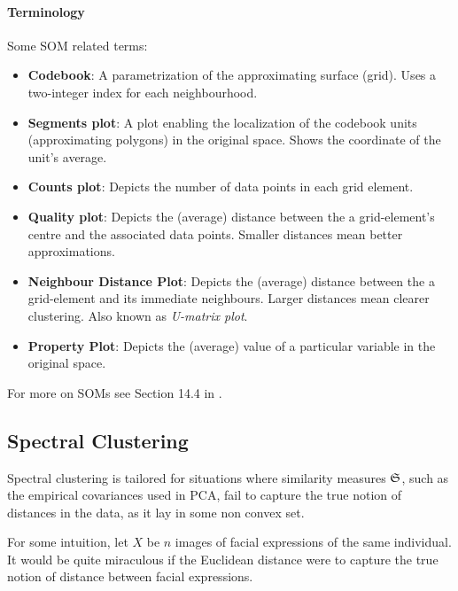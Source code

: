 \paragraph{Terminology}
Some SOM related terms:
\begin{itemize}
\item \textbf{Codebook}: A parametrization of the approximating surface (grid). Uses a two-integer index for each neighbourhood.
\item \textbf{Segments plot}: A plot enabling the localization of the codebook units (approximating polygons) in the original space. Shows the coordinate of the unit's average.
\item \textbf{Counts plot}: Depicts the number of data points in each grid element.
\item \textbf{Quality plot}: Depicts the (average) distance between the a grid-element's centre and the associated data points. Smaller distances mean better approximations.
\item \textbf{Neighbour Distance Plot}: Depicts the (average) distance between the a grid-element and its immediate neighbours. Larger distances mean clearer clustering. Also known as \emph{U-matrix plot}.
\item \textbf{Property Plot}: Depicts the (average) value of a particular variable in the original space.
\end{itemize}

For more on SOMs see Section 14.4 in \cite{hastie_elements_2003}. 





\subsection{Spectral Clustering}
\label{sec:spectral_clustering}



Spectral clustering is tailored for situations where \naive similarity measures $\mathfrak{S}$, such as the empirical covariances used in PCA, fail to capture the true notion of distances in the data, as it lay in some non convex set. 

For some intuition, let $X$ be $n$ images of facial expressions of the same individual. It would be quite miraculous if the Euclidean distance were to capture the true notion of distance between facial expressions. 

